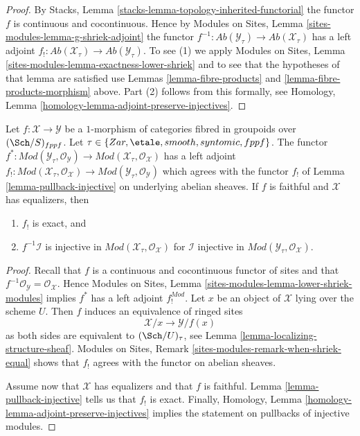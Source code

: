 \begin{proof}
By
Stacks, Lemma \ref{stacks-lemma-topology-inherited-functorial}
the functor $f$ is continuous and cocontinuous. Hence by
Modules on Sites, Lemma \ref{sites-modules-lemma-g-shriek-adjoint}
the functor
$f^{-1} : \textit{Ab}(\mathcal{Y}_\tau) \to \textit{Ab}(\mathcal{X}_\tau)$
has a left adjoint
$f_! : \textit{Ab}(\mathcal{X}_\tau) \to \textit{Ab}(\mathcal{Y}_\tau)$.
To see (1) we apply
Modules on Sites, Lemma \ref{sites-modules-lemma-exactness-lower-shriek}
and to see that the hypotheses of that lemma are satisfied use
Lemmas \ref{lemma-fibre-products} and
\ref{lemma-fibre-products-morphism}
above. Part (2) follows from this formally, see
Homology, Lemma \ref{homology-lemma-adjoint-preserve-injectives}.
\end{proof}

\begin{lemma}
\label{lemma-pullback-injective-modules}
Let $f : \mathcal{X} \to \mathcal{Y}$ be a $1$-morphism of categories
fibred in groupoids over $(\Sch/S)_{fppf}$. Let
$\tau \in \{Zar, \etale, smooth, syntomic, fppf\}$.
The functor
$f^* : \textit{Mod}(\mathcal{Y}_\tau, \mathcal{O}_\mathcal{Y}) \to
\textit{Mod}(\mathcal{X}_\tau, \mathcal{O}_\mathcal{X})$
has a left adjoint
$f_! : \textit{Mod}(\mathcal{X}_\tau, \mathcal{O}_\mathcal{X}) \to
\textit{Mod}(\mathcal{Y}_\tau, \mathcal{O}_\mathcal{Y})$ which
agrees with the functor $f_!$ of Lemma \ref{lemma-pullback-injective}
on underlying abelian sheaves.
If $f$ is faithful and $\mathcal{X}$ has equalizers, then
\begin{enumerate}
\item $f_!$ is exact, and
\item $f^{-1}\mathcal{I}$ is injective in
$\textit{Mod}(\mathcal{X}_\tau, \mathcal{O}_\mathcal{X})$
for $\mathcal{I}$ injective in
$\textit{Mod}(\mathcal{Y}_\tau, \mathcal{O}_\mathcal{X})$.
\end{enumerate}
\end{lemma}

\begin{proof}
Recall that $f$ is a continuous and cocontinuous functor of sites
and that $f^{-1}\mathcal{O}_\mathcal{Y} = \mathcal{O}_\mathcal{X}$. Hence
Modules on Sites, Lemma \ref{sites-modules-lemma-lower-shriek-modules}
implies $f^*$ has a left adjoint $f_!^{Mod}$.
Let $x$ be an object of $\mathcal{X}$ lying over the scheme $U$.
Then $f$ induces an equivalence of ringed sites
$$
\mathcal{X}/x \longrightarrow \mathcal{Y}/f(x)
$$
as both sides are equivalent to $(\Sch/U)_\tau$, see
Lemma \ref{lemma-localizing-structure-sheaf}.
Modules on Sites, Remark \ref{sites-modules-remark-when-shriek-equal}
shows that $f_!$ agrees with the functor on abelian sheaves.

\medskip\noindent
Assume now that $\mathcal{X}$ has equalizers and that $f$ is faithful.
Lemma \ref{lemma-pullback-injective}
tells us that $f_!$ is exact. Finally,
Homology, Lemma \ref{homology-lemma-adjoint-preserve-injectives}
implies the statement on pullbacks of injective modules.
\end{proof}





